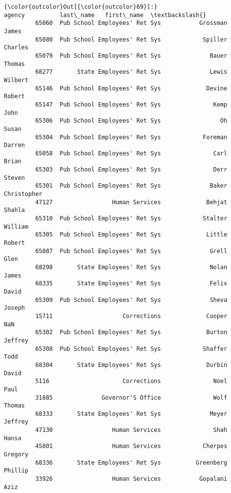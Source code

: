 \documentclass[11pt]{article}
\begin{document}
\begin{Verbatim}[commandchars=\\\{\}]
{\color{outcolor}Out[{\color{outcolor}69}]:}                               agency          last\_name   first\_name  \textbackslash{}
         65060  Pub School Employees' Ret Sys           Grossman        James   
         65080  Pub School Employees' Ret Sys            Spiller      Charles   
         65079  Pub School Employees' Ret Sys              Bauer       Thomas   
         68277       State Employees' Ret Sys              Lewis      Wilbert   
         65146  Pub School Employees' Ret Sys             Devine       Robert   
         65147  Pub School Employees' Ret Sys               Kemp         John   
         65306  Pub School Employees' Ret Sys                 Oh        Susan   
         65304  Pub School Employees' Ret Sys            Foreman       Darren   
         65058  Pub School Employees' Ret Sys               Carl        Brian   
         65303  Pub School Employees' Ret Sys               Derr       Steven   
         65301  Pub School Employees' Ret Sys              Baker  Christopher   
         47127                 Human Services             Behjat       Shahla   
         65310  Pub School Employees' Ret Sys            Stalter      William   
         65305  Pub School Employees' Ret Sys             Little       Robert   
         65087  Pub School Employees' Ret Sys              Grell         Glen   
         68298       State Employees' Ret Sys              Nolan        James   
         68335       State Employees' Ret Sys              Felix        David   
         65309  Pub School Employees' Ret Sys              Sheva       Joseph   
         15711                    Corrections             Cooper          NaN   
         65302  Pub School Employees' Ret Sys             Burton      Jeffrey   
         65308  Pub School Employees' Ret Sys            Shaffer         Todd   
         68304       State Employees' Ret Sys             Durbin        David   
         5116                     Corrections               Noel         Paul   
         31885              Governor'S Office               Wolf       Thomas   
         68333       State Employees' Ret Sys              Meyer      Jeffrey   
         47130                 Human Services               Shah        Hansa   
         45801                 Human Services            Cherpes      Gregory   
         68336       State Employees' Ret Sys          Greenberg      Phillip   
         33926                 Human Services           Gopalani         Aziz   

\end{Verbatim}
\end{document}
